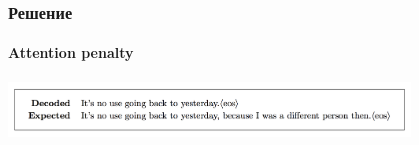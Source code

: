 \documentclass[10pt]{beamer}
\begin{document}
\begin{frame}
\frametitle{Решение}
\framesubtitle{Attention penalty}


\begin{center}
    \includegraphics[width=0.8\textwidth]{images/bad_sample.png}
\end{center}


\end{frame}
\end{document}
